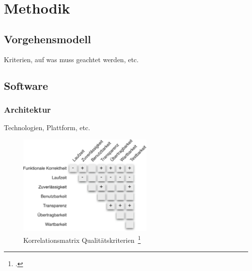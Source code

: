 \chapter{Methodik}

\section{Vorgehensmodell}

Kriterien, auf was muss geachtet werden, etc.

\section{Software}

\subsection{Architektur}

Technologien, Plattform, etc.

\begin{savenotes}
    \begin{figure}[H] 
      \centering
         \includegraphics[width=0.6\textwidth]{img/korrelationsmatrix-kriterien.png}
      \caption[Korrelationsmatrix Qualitätskriterien]{Korrelationsmatrix Qualitätskriterien~\footcite[][S. 11, Abb. 1.3]{hoffmann_software_qualitat_2013}}\label{fig:Korrelationsmatrix Qualitätskriterien}
    \end{figure}
  \end{savenotes}
